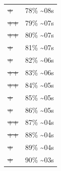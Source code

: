 \documentclass[12pt]{article}
\begin{document}
\begin{center}
\begin{tabular}{ll}
\sout{\sout{\sout{\sout{\sout{\sout{\sout{\sout{\sout{\sout{\sout{\sout{\sout{\sout{\sout{\sout{\sout{\sout{\sout{+}}}}}}}}}}}}}}}}}}} & 78\% \textasciitilde{}08s\\
\sout{\sout{\sout{\sout{\sout{\sout{\sout{\sout{\sout{\sout{\sout{\sout{\sout{\sout{\sout{\sout{\sout{\sout{\sout{++}}}}}}}}}}}}}}}}}}} & 79\% \textasciitilde{}07s\\
\sout{\sout{\sout{\sout{\sout{\sout{\sout{\sout{\sout{\sout{\sout{\sout{\sout{\sout{\sout{\sout{\sout{\sout{\sout{++}}}}}}}}}}}}}}}}}}} & 80\% \textasciitilde{}07s\\
\sout{\sout{\sout{\sout{\sout{\sout{\sout{\sout{\sout{\sout{\sout{\sout{\sout{\sout{\sout{\sout{\sout{\sout{\sout{\sout{+}}}}}}}}}}}}}}}}}}}} & 81\% \textasciitilde{}07s\\
\sout{\sout{\sout{\sout{\sout{\sout{\sout{\sout{\sout{\sout{\sout{\sout{\sout{\sout{\sout{\sout{\sout{\sout{\sout{\sout{+}}}}}}}}}}}}}}}}}}}} & 82\% \textasciitilde{}06s\\
\sout{\sout{\sout{\sout{\sout{\sout{\sout{\sout{\sout{\sout{\sout{\sout{\sout{\sout{\sout{\sout{\sout{\sout{\sout{\sout{++}}}}}}}}}}}}}}}}}}}} & 83\% \textasciitilde{}06s\\
\sout{\sout{\sout{\sout{\sout{\sout{\sout{\sout{\sout{\sout{\sout{\sout{\sout{\sout{\sout{\sout{\sout{\sout{\sout{\sout{++}}}}}}}}}}}}}}}}}}}} & 84\% \textasciitilde{}05s\\
\sout{\sout{\sout{\sout{\sout{\sout{\sout{\sout{\sout{\sout{\sout{\sout{\sout{\sout{\sout{\sout{\sout{\sout{\sout{\sout{\sout{+}}}}}}}}}}}}}}}}}}}}} & 85\% \textasciitilde{}05s\\
\sout{\sout{\sout{\sout{\sout{\sout{\sout{\sout{\sout{\sout{\sout{\sout{\sout{\sout{\sout{\sout{\sout{\sout{\sout{\sout{\sout{+}}}}}}}}}}}}}}}}}}}}} & 86\% \textasciitilde{}05s\\
\sout{\sout{\sout{\sout{\sout{\sout{\sout{\sout{\sout{\sout{\sout{\sout{\sout{\sout{\sout{\sout{\sout{\sout{\sout{\sout{\sout{++}}}}}}}}}}}}}}}}}}}}} & 87\% \textasciitilde{}04s\\
\sout{\sout{\sout{\sout{\sout{\sout{\sout{\sout{\sout{\sout{\sout{\sout{\sout{\sout{\sout{\sout{\sout{\sout{\sout{\sout{\sout{++}}}}}}}}}}}}}}}}}}}}} & 88\% \textasciitilde{}04s\\
\sout{\sout{\sout{\sout{\sout{\sout{\sout{\sout{\sout{\sout{\sout{\sout{\sout{\sout{\sout{\sout{\sout{\sout{\sout{\sout{\sout{\sout{+}}}}}}}}}}}}}}}}}}}}}} & 89\% \textasciitilde{}04s\\
\sout{\sout{\sout{\sout{\sout{\sout{\sout{\sout{\sout{\sout{\sout{\sout{\sout{\sout{\sout{\sout{\sout{\sout{\sout{\sout{\sout{\sout{+}}}}}}}}}}}}}}}}}}}}}} & 90\% \textasciitilde{}03s\\

\end{tabular}
\end{center}
\end{document}
